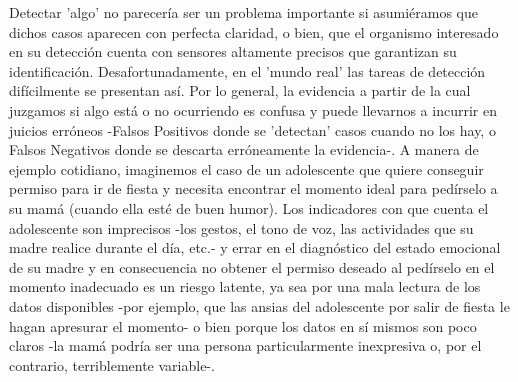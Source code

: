 Detectar 'algo' no parecería ser un problema importante si asumiéramos que dichos casos aparecen con perfecta claridad, o bien, que el organismo interesado en su detección cuenta con sensores altamente precisos que garantizan su identificación. Desafortunadamente, en el 'mundo real' las tareas de detección difícilmente se presentan así. Por lo general, la evidencia a partir de la cual juzgamos si algo está o no ocurriendo es confusa y puede llevarnos a incurrir en juicios erróneos -Falsos Positivos donde se 'detectan' casos cuando no los hay, o Falsos Negativos donde se descarta erróneamente la evidencia-. A manera de ejemplo cotidiano, imaginemos el caso de un adolescente que quiere conseguir permiso para ir de fiesta y necesita encontrar el momento ideal para pedírselo a su mamá (cuando ella esté de buen humor). Los indicadores con que cuenta el adolescente son imprecisos -los gestos, el tono de voz, las actividades que su madre realice durante el día, etc.- y errar en el diagnóstico del estado emocional de su madre y en consecuencia no obtener el permiso deseado al pedírselo en el momento inadecuado es un riesgo latente, ya sea por una mala lectura de los datos disponibles -por ejemplo, que las ansias del adolescente por salir de fiesta le hagan apresurar el momento- o bien porque los datos en sí mismos son poco claros -la mamá podría ser una persona particularmente inexpresiva o, por el contrario, terriblemente variable-.\\ 


